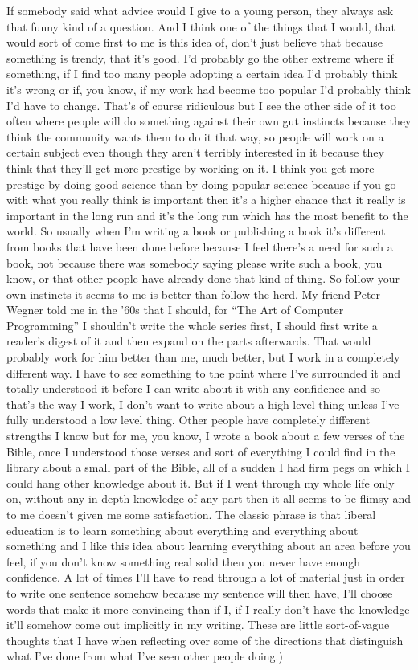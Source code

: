 \documentclass[]{article}
\begin{document}
If somebody said what advice would I give to a young person, they always
ask that funny kind of a question. And I think one of the things that I
would, that would sort of come first to me is this idea of, don't just
believe that because something is trendy, that it's good. I'd probably
go the other extreme where if something, if I find too many people
adopting a certain idea I'd probably think it's wrong or if, you know,
if my work had become too popular I'd probably think I'd have to change.
That's of course ridiculous but I see the other side of it too often
where people will do something against their own gut instincts because
they think the community wants them to do it that way, so people will
work on a certain subject even though they aren't terribly interested in
it because they think that they'll get more prestige by working on it. I
think you get more prestige by doing good science than by doing popular
science because if you go with what you really think is important then
it's a higher chance that it really is important in the long run and
it's the long run which has the most benefit to the world. So usually
when I'm writing a book or publishing a book it's different from books
that have been done before because I feel there's a need for such a
book, not because there was somebody saying please write such a book,
you know, or that other people have already done that kind of thing. So
follow your own instincts it seems to me is better than follow the herd.
My friend Peter Wegner told me in the '60s that I should, for ``The Art
of Computer Programming'' I shouldn't write the whole series first, I
should first write a reader's digest of it and then expand on the parts
afterwards. That would probably work for him better than me, much
better, but I work in a completely different way. I have to see
something to the point where I've surrounded it and totally understood
it before I can write about it with any confidence and so that's the way
I work, I don't want to write about a high level thing unless I've fully
understood a low level thing. Other people have completely different
strengths I know but for me, you know, I wrote a book about a few verses
of the Bible, once I understood those verses and sort of everything I
could find in the library about a small part of the Bible, all of a
sudden I had firm pegs on which I could hang other knowledge about it.
But if I went through my whole life only on, without any in depth
knowledge of any part then it all seems to be flimsy and to me doesn't
given me some satisfaction. The classic phrase is that liberal education
is to learn something about everything and everything about something
and I like this idea about learning everything about an area before you
feel, if you don't know something real solid then you never have enough
confidence. A lot of times I'll have to read through a lot of material
just in order to write one sentence somehow because my sentence will
then have, I'll choose words that make it more convincing than if I, if
I really don't have the knowledge it'll somehow come out implicitly in
my writing. These are little sort-of-vague thoughts that I have when
reflecting over some of the directions that distinguish what I've done
from what I've seen other people doing.)
\end{document}
